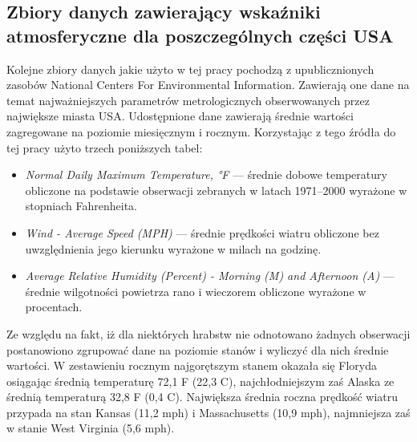 \documentclass[polish, twoside, 12pt, a4paper]{article}
\theoremstyle{definition}
\theoremstyle{plain}
\theoremstyle{remark}
\begin{document}
\subsection{Zbiory danych zawierający wskaźniki atmosferyczne dla poszczególnych części USA}

Kolejne zbiory danych jakie użyto w tej pracy pochodzą z upublicznionych zasobów National Centers For Environmental Information. Zawierają one dane na temat najważniejszych parametrów metrologicznych obserwowanych przez największe miasta USA. Udostępnione dane zawierają średnie wartości zagregowane na poziomie miesięcznym i rocznym. Korzystając z tego źródła do tej pracy użyto trzech poniższych tabel:
\begin{itemize}[noitemsep]
  \item \emph{Normal Daily Maximum Temperature, °F} --- średnie dobowe temperatury obliczone na podstawie obserwacji zebranych w latach 1971--2000 wyrażone w stopniach Fahrenheita.
  \item \emph{Wind - Average Speed (MPH)} --- średnie prędkości wiatru obliczone bez uwzględnienia jego kierunku wyrażone w milach na godzinę.
  \item \emph{Average Relative Humidity (Percent) - Morning (M) and Afternoon (A)} --- średnie wilgotności powietrza rano i wieczorem obliczone wyrażone w procentach.
\end{itemize}

Ze względu na fakt, iż dla niektórych hrabstw nie odnotowano żadnych obserwacji postanowiono zgrupować dane na poziomie stanów i wyliczyć dla nich średnie wartości. W zestawieniu rocznym najgorętszym stanem okazała się Floryda osiągając średnią temperaturę 72,1 \textdegree F (22,3 \textdegree C), najchłodniejszym zaś Alaska ze średnią temperaturą 32,8 \textdegree F (0,4 \textdegree C). Największa średnia roczna prędkość wiatru przypada na stan Kansas (11,2 mph) i Massachusetts (10,9 mph), najmniejsza zaś w stanie West Virginia (5,6 mph). 
\end{document}
